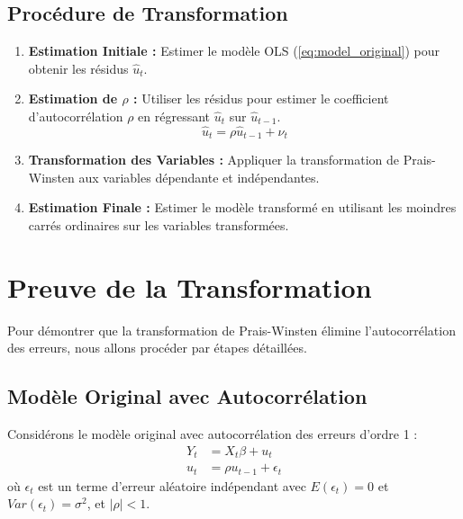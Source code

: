 \documentclass[14pt]{extarticle} %
\theoremstyle{definition}
\theoremstyle{plain}
\begin{document}
\subsection{Procédure de Transformation}
\begin{enumerate}
    \item \textbf{Estimation Initiale :} Estimer le modèle OLS (\ref{eq:model_original}) pour obtenir les résidus \( \hat{u}_t \).
    \item \textbf{Estimation de \( \rho \) :} Utiliser les résidus pour estimer le coefficient d'autocorrélation \( \rho \) en régressant \( \hat{u}_t \) sur \( \hat{u}_{t-1} \).
    \begin{equation}
    \hat{u}_t = \rho \hat{u}_{t-1} + \nu_t
    \end{equation}
    \item \textbf{Transformation des Variables :} Appliquer la transformation de Prais-Winsten aux variables dépendante et indépendantes.
    \item \textbf{Estimation Finale :} Estimer le modèle transformé en utilisant les moindres carrés ordinaires sur les variables transformées.
\end{enumerate}

\section{Preuve de la Transformation}
Pour démontrer que la transformation de Prais-Winsten élimine l'autocorrélation des erreurs, nous allons procéder par étapes détaillées.

\subsection{Modèle Original avec Autocorrélation}
Considérons le modèle original avec autocorrélation des erreurs d'ordre 1 :
\begin{align}
Y_t &= X_t \beta + u_t \label{eq:model_original_repeat} \\
u_t &= \rho u_{t-1} + \epsilon_t \label{eq:autocorr_error_repeat}
\end{align}
où \( \epsilon_t \) est un terme d'erreur aléatoire indépendant avec \( E(\epsilon_t) = 0 \) et \( Var(\epsilon_t) = \sigma^2 \), et \( |\rho| < 1 \).
\end{document}
